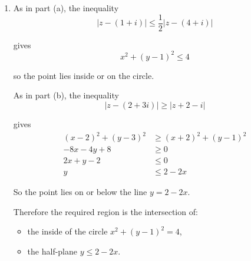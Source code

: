 \documentclass[leqno]{article}
\begin{document}
\begin{enumerate}[
  label=\textbf{\arabic*.},
  leftmargin=*,
  topsep=0pt,
  partopsep=0pt,
  parsep=0pt
]
\begin{djsSolution}
\begin{enumerate}[label=\textbf{(\alph*)}]
  So the locus of $Q$ is the straight line
  \[
  y=2-2x
  \]

  This is the perpendicular bisector of the line segment joining $(2,3)$ and $(-2,1)$.

  On the same Argand diagram, we sketch:
  \begin{itemize}
    \item the circle $x^2+(y-1)^2=4$, centre $(0,1)$, radius $2$,
    \item the line $y=2-2x$.
  \end{itemize}

  \begin{center}
  \end{center}

  \item As in part (a), the inequality
  \[
  \lvert z-(1+i)\rvert\le \frac12\lvert z-(4+i)\rvert
  \]

  gives
  \[
  x^2+(y-1)^2\le 4
  \]

  so the point lies inside or on the circle.

  As in part (b), the inequality
  \[
  \lvert z-(2+3i)\rvert\ge \lvert z+2-i\rvert
  \]

  gives
  \begin{align*}
  (x-2)^2+(y-3)^2&\ge (x+2)^2+(y-1)^2\\
  -8x-4y+8&\ge 0\\
  2x+y-2&\le 0\\
  y&\le 2-2x
  \end{align*}

  So the point lies on or below the line $y=2-2x$.

  Therefore the required region is the intersection of:
  \begin{itemize}
    \item the inside of the circle $x^2+(y-1)^2=4$,
    \item the half-plane $y\le 2-2x$.
  \end{itemize}


\end{enumerate}
\end{djsSolution}
\end{enumerate}
\end{document}
